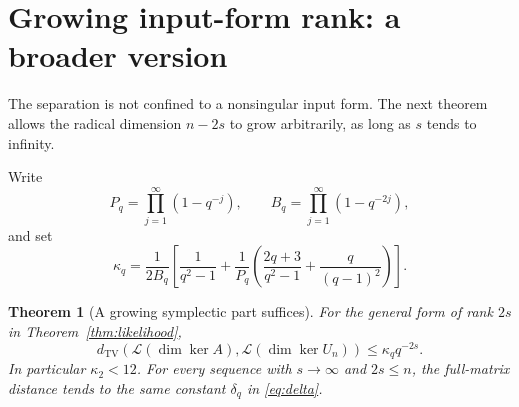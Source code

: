 \documentclass[11pt]{article}
\newcommand{\TV}{d_{\mathrm{TV}}}
\newcommand{\Law}{\mathcal L}
\newcommand{\1}{\mathbf 1}
\newtheorem{theorem}{Theorem}[section]
\theoremstyle{definition}
\theoremstyle{remark}
\numberwithin{equation}{section}
\begin{document}
\section{Growing input-form rank: a broader version}
The separation is not confined to a nonsingular input form. The next theorem allows the radical dimension $n-2s$ to grow arbitrarily, as long as $s$ tends to infinity.

Write
\[
P_q=\prod_{j=1}^\infty(1-q^{-j}),\qquad
B_q=\prod_{j=1}^\infty(1-q^{-2j}),
\]
and set
\begin{equation}\label{eq:rateconstant}
\kappa_q=\frac1{2B_q}\left[
\frac1{q^2-1}+\frac1{P_q}
\left(\frac{2q+3}{q^2-1}+\frac{q}{(q-1)^2}\right)\right].
\end{equation}

\begin{theorem}[A growing symplectic part suffices]\label{thm:growing}
For the general form of rank $2s$ in Theorem~\ref{thm:likelihood},
\begin{equation}\label{eq:general-rate}
\TV(\Law(\dim\ker A),\Law(\dim\ker U_n))\le\kappa_q q^{-2s}.
\end{equation}
In particular $\kappa_2<12$. For every sequence with $s\to\infty$ and $2s\le n$, the full-matrix distance tends to the same constant $\delta_q$ in \eqref{eq:delta}.
\end{theorem}
\end{document}
